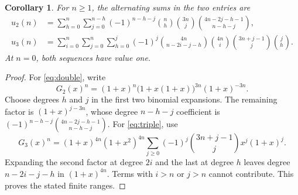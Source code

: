 \documentclass[11pt]{article}
\newtheorem{corollary}[theorem]{Corollary}
\begin{document}
\begin{corollary}\label{cor:alternating}
For $n\geq1$, the alternating sums in the two entries are
\begin{align}
 u_2(n)&=\sum_{h=0}^{n}\sum_{j=0}^{n-h}
 (-1)^{n-h-j}\binom nh\binom{3n}{j}
 \binom{4n-2j-h-1}{n-h-j},\label{eq:double}\\
 u_3(n)&=\sum_{i=0}^{n}\sum_{j=0}^{n}\sum_{h=0}^{j}
 (-1)^j\binom{4n}{n-2i-j-h}\binom{4n}{i}
 \binom{3n+j-1}{j}\binom jh.\label{eq:triple}
\end{align}
At $n=0$, both sequences have value one.
\end{corollary}
\begin{proof}
For \eqref{eq:double}, write
\[
 G_2(x)^n=(1+x)^n\bigl(1+x(1+x)\bigr)^{3n}(1+x)^{-3n}.
\]
Choose degrees $h$ and $j$ in the first two binomial expansions.
The remaining factor is $(1+x)^{j-3n}$, whose degree $n-h-j$
coefficient is
$(-1)^{n-h-j}\binom{4n-2j-h-1}{n-h-j}$.
For \eqref{eq:triple}, use
\[
 G_3(x)^n=(1+x)^{4n}(1+x^2)^{4n}
 \sum_{j\geq0}(-1)^j\binom{3n+j-1}{j}x^j(1+x)^j.
\]
Expanding the second factor at degree $2i$ and the last at degree $h$
leaves degree $n-2i-j-h$ in $(1+x)^{4n}$. Terms with $i>n$ or $j>n$
cannot contribute. This proves the stated finite ranges.
\end{proof}
\end{document}
